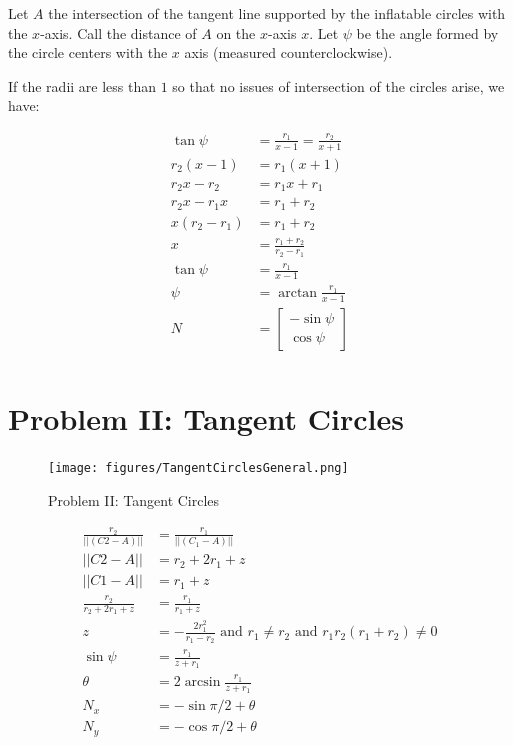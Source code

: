 \documentclass{article}
\begin{document}
Let $A$ the intersection of the tangent line supported
by the inflatable circles with the $x$-axis. Call the distance of $A$
on the $x$-axis $x$. Let $\psi$ be the angle formed by the
circle centers with the $x$ axis (measured counterclockwise).

If the radii are less than $1$ so that no issues of intersection
of the circles arise, we have:

\begin{align}
  \tan{\psi} &= \frac{r_1}{x-1} = \frac{r_2}{x+1}  \\
  r_2(x - 1) &= r_1(x+1) \\
  r_2x - r_2 &= r_1x + r_1 \\
  r_2x - r_1x &= r_1 + r_2 \\
  x(r_2 - r_1) &= r_1 + r_2 \\
  x &= \frac{r_1+r_2}{r_2 - r_1} \\
  \tan{\psi} &= \frac{r_1}{x - 1} \\
  \psi &= \arctan{\frac{r_1}{x - 1}} \\
  N &=  \begin{bmatrix} -\sin{\psi} \\ \cos{\psi}  \end{bmatrix} \\
\end{align}





\section{Problem II: Tangent Circles}



\begin{figure}
     \centering
     \texttt{[image: figures/TangentCirclesGeneral.png]}
     \caption{Problem II: Tangent Circles}
  \label{fig:Tangent}
\end{figure}

\begin{align}
\frac{r_2}{||(C2 - A)||} &= \frac{r_1}{||(C_1-A)||} \\
||C2 - A|| &= r_2+2r_1+z \\
||C1 - A|| &= r_1 + z \\
\frac{r_2}{r_2+2r_1+z} &= \frac{r_1}{r_1+z} \\
z &= -\frac{2 r_1^2}{r_1 - r_2} \text{ and } r_1 \neq r_2 \text{ and } r_1 r_2 (r_1 + r_2) \neq 0 \\
\sin{\psi} &= \frac{r_1}{z + r_1} \\
\theta &=2 \arcsin{\frac{r_1}{z+r_1}} \\
N_x &= -\sin{\pi/2 + \theta} \\
N_y &= -\cos{\pi/2 + \theta} \\
\end{align}
\end{document}
